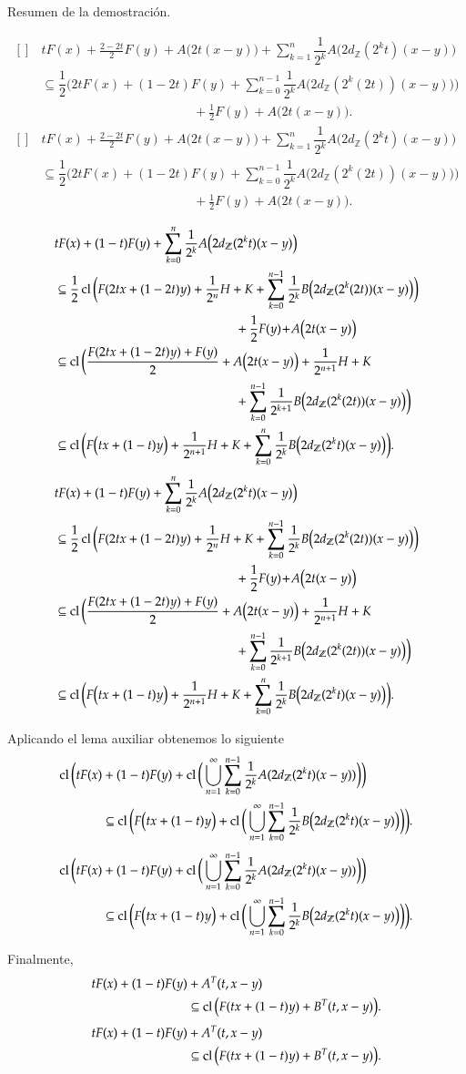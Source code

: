 \documentclass[notheorems,envcountsect,serif,mathserif,professionalfonts,spanish,10pt]{beamer}
\newcommand{\Z}{\mathbb{Z}}
\newcommand{\cl}{\mathop{\hbox{\rm cl}}\nolimits}
\theoremstyle{definition}
\def\Eq#1#2{\ifthenelse{\equal{#1}{*}}
  {\begin{equation*}\begin{aligned}[]#2\end{aligned}\end{equation*}}
  {\begin{equation}\begin{aligned}[]\label{E#1}#2\end{aligned}\end{equation}}}
\begin{document}
\begin{frame}[allowframebreaks]{Resumen de la demostración.}
	\begin{block}{}
	\Eq{*}{
		&tF(x)+\frac{2-2t}2F(y)+ A\big(2t(x-y)\big) 
		+ \sum_{k=1}^{n}{\dfrac{1}{2^k}A\big(2 d_{\Z}(2^kt)(x-y)\big)} \\
		&\subseteq \dfrac{1}{2}\bigg( 2tF(x)+(1-2t)F(y)
		+ \sum_{k=0}^{n-1}{\dfrac{1}{2^k}A\big(2 d_{\Z}(2^k(2t))(x-y)\big)} \bigg) \\
		&\hspace{5cm}+ \frac{1}{2}F(y) \!+\! A\big(2t(x-y)\big).
	}
	\end{block}
	
	\begin{block}{}

	\Eq{*}{
 & tF(x)+(1-t)F(y) + \sum_{k=0}^{n}{\dfrac{1}{2^k}A\big(2 d_{\Z}(2^k t)(x-y)\big)} \\
 & \subseteq \dfrac{1}{2}\cl\bigg(F(2tx + (1-2t)y)+ \frac{1}{2^n}H + K 
   + \sum_{k=0}^{n-1} \dfrac{1}{2^k}B\big(2 d_{\Z}(2^k(2t))(x-y)\big)\bigg) \\
 &\hspace{5cm} + \frac{1}{2}F(y) \!+\! A\big(2t(x-y)\big)\\
 & \subseteq \cl\bigg(\dfrac{F(2tx + (1-2t)y)+ F(y)}{2}+ A\big(2t(x-y)\big) 
     + \frac{1}{2^{n+1}}H + K\\
&\hspace{5cm}		+ \sum_{k=0}^{n-1}\dfrac{1}{2^{k+1}}B\big(2d_{\Z}(2^k(2t))(x-y)\big)\bigg)\\
& \subseteq  \cl\bigg(F\big(tx+(1-t)y\big) + \frac{1}{2^{n+1}}H + K 
  + \sum_{k=0}^{n}\dfrac{1}{2^{k}}B\big(2d_{\Z}(2^k t)(x-y)\big)\bigg).
	}
	\end{block}
	
	\begin{block}{}
	Aplicando el lema auxiliar obtenemos lo siguiente
	\Eq{*}{
  \cl\bigg(tF(x)&+(1-t)F(y) + \cl\bigg(\bigcup_{n=1}^\infty
     \sum_{k=0}^{n-1}\dfrac{1}{2^k}A(2 d_{\Z}(2^k t)(x-y))\bigg)\bigg)\\
  &\subseteq \cl\bigg(F\big(tx+(1-t)y\big) +\cl\bigg(\bigcup_{n=1}^\infty 
     \sum_{k=0}^{n-1}\dfrac{1}{2^{k}}B\big(2d_{\Z}(2^k t)(x-y)\big)\bigg)\bigg).
	}
	\end{block}
	
	\begin{block}{}
	Finalmente,
	\Eq{*}{
	tF(x)+(1-t)F(y) &+ A^T(t,x-y) \\
	&\subseteq \cl\big( F(tx+(1-t)y) + B^T(t,x-y)\big). 
	}
	\end{block}
	
	
	
\end{frame}
\end{document}

